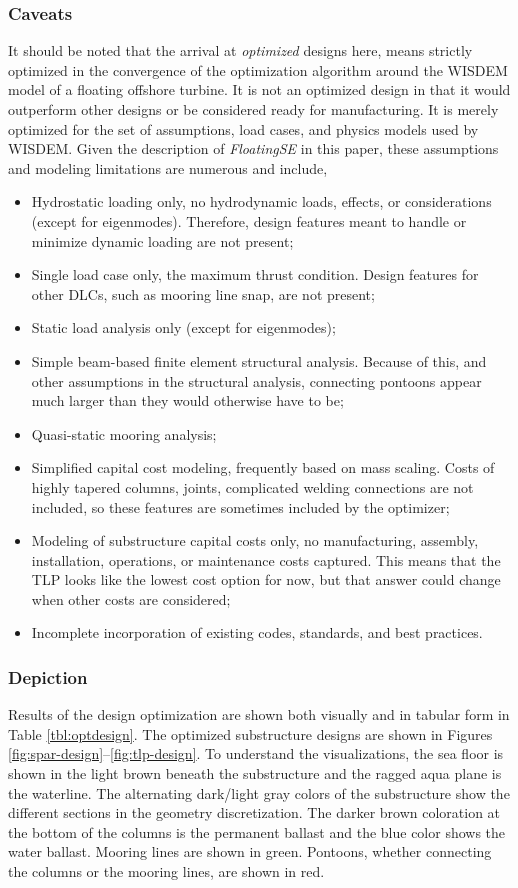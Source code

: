 \subsubsection{Caveats}
It should be noted that the arrival at \textit{optimized} designs here,
means strictly optimized in the convergence of the optimization
algorithm around the WISDEM model of a floating offshore turbine.  It is
not an optimized design in that it would outperform other designs or be
considered ready for manufacturing.  It is merely optimized for the set
of assumptions, load cases, and physics models used by WISDEM.  Given
the description of \textit{FloatingSE} in this paper, these assumptions
and modeling limitations are numerous and include,
\begin{itemize}
\item Hydrostatic loading only, no hydrodynamic loads, effects, or
  considerations (except for eigenmodes).  Therefore, design features
  meant to handle or minimize dynamic loading are not present;
\item Single load case only, the maximum thrust condition.  Design
  features for other DLCs, such as mooring line snap, are not present;
\item Static load analysis only (except for eigenmodes);
\item Simple beam-based finite element structural analysis.  Because of
  this, and other assumptions in the structural analysis, connecting
  pontoons appear much larger than they would otherwise have to be;
\item Quasi-static mooring analysis;
\item Simplified capital cost modeling, frequently based on mass
  scaling.  Costs of highly tapered columns, joints, complicated welding
  connections are not included, so these features are sometimes included
  by the optimizer;
\item Modeling of substructure capital costs only, no manufacturing,
  assembly, installation, operations, or maintenance costs captured.
  This means that the TLP looks like the lowest cost option for now,
  but that answer could change when other costs are considered;
\item Incomplete incorporation of existing codes, standards, and best
  practices.
\end{itemize}

\subsubsection{Depiction}
Results of the design optimization are shown both visually and in
tabular form in Table \ref{tbl:optdesign}.  The optimized substructure
designs are shown in Figures
\ref{fig:spar-design}--\ref{fig:tlp-design}.  To understand the
visualizations, the sea floor is shown in the light brown beneath the
substructure and the ragged aqua plane is the waterline.  The
alternating dark/light gray colors of the substructure show the
different sections in the geometry discretization.  The darker brown
coloration at the bottom of the columns is the permanent ballast and the
blue color shows the water ballast.  Mooring lines are shown in green.
Pontoons, whether connecting the columns or the mooring lines, are shown
in red.

